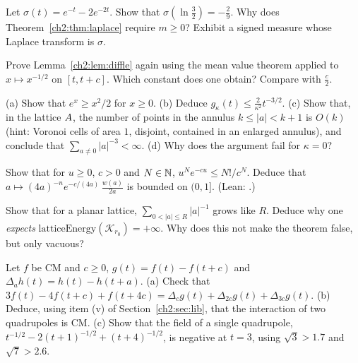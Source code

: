 \begin{exercise}\label{ch2:ex:signedmix}
Let $\sigma(t)=e^{-t}-2e^{-2t}$. Show that $\sigma(\ln\frac32)=-\frac29$. Why does Theorem~\ref{ch2:thm:laplace}
require $m\ge0$? Exhibit a signed measure whose Laplace transform is $\sigma$.
\end{exercise}

\begin{exercise}\label{ch2:ex:diffle}
Prove Lemma~\ref{ch2:lem:diffle} again using the mean value theorem applied to $x\mapsto x^{-1/2}$ on $[t,t+c]$.
Which constant does one obtain? Compare with $\frac c2$.
\end{exercise}

\begin{exercise}
(a) Show that $e^x\ge x^2/2$ for $x\ge0$. (b) Deduce $g_\kappa(t)\le\frac2{\kappa^2}t^{-3/2}$. (c) Show that,
in the lattice $A$, the number of points in the annulus $k\le|a|<k+1$ is $O(k)$ (hint: Voronoi cells
of area $1$, disjoint, contained in an enlarged annulus), and conclude that $\sum_{a\ne0}|a|^{-3}<\infty$.
(d) Why does the argument fail for $\kappa=0$?
\end{exercise}

\begin{exercise}
Show that for $u\ge0$, $c>0$ and $N\in\mathbb{N}$, $u^Ne^{-cu}\le N!/c^N$. Deduce that
$a\mapsto(4a)^{-n}e^{-c/(4a)}\,\frac{w(a)}{2a}$ is bounded on $(0,1]$. (Lean: .)
\end{exercise}

\begin{exercise}
Show that for a planar lattice, $\sum_{0<|a|\le R}|a|^{-1}$ grows like $R$. Deduce why one
\emph{expects} $\mathrm{latticeEnergy}(\mathcal K_{r_0})=+\infty$. Why does this not make the theorem
 false, but only vacuous?
\end{exercise}

\begin{exercise}[quadrupoles]\label{ch2:ex:quad}
Let $f$ be CM and $c\ge0$, $g(t)=f(t)-f(t+c)$ and $\Delta_ah(t)=h(t)-h(t+a)$. (a) Check that
$3f(t)-4f(t+c)+f(t+4c)=\Delta_cg(t)+\Delta_{2c}g(t)+\Delta_{3c}g(t)$. (b) Deduce, using item (v) of
Section~\ref{ch2:sec:lib}, that the interaction of two quadrupoles is CM. (c) Show that the field of a single quadrupole,
$t^{-1/2}-2(t+1)^{-1/2}+(t+4)^{-1/2}$, is negative at $t=3$, using $\sqrt3>1.7$ and $\sqrt7>2.6$.
\end{exercise}

